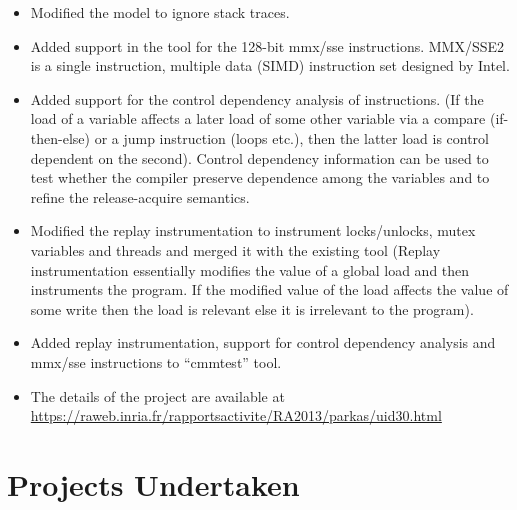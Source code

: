 \documentclass[margin,line]{resume}
\begin{document}
\begin{resume}
\begin{itemize}
\begin{itemize}
      \item Modified the model to ignore stack traces.
      \item Added support in the tool for the 128-bit mmx/sse instructions. MMX/SSE2 is a single instruction, multiple data (SIMD) instruction set designed by Intel.
      \item Added support for the control dependency analysis of instructions. (If the load of a variable affects a later load of some other variable via a compare (if-then-else) or a jump instruction (loops etc.), then the latter load is control dependent on the second). Control dependency information can be used to test whether the compiler preserve dependence among the variables and to refine the release-acquire semantics.
      \item Modified the replay instrumentation to instrument locks/unlocks, mutex variables and threads and merged it with the existing tool (Replay instrumentation essentially modifies the value of a global load and then instruments the program. If the modified value of the load affects the value of some write then the load is relevant else it is irrelevant to the program).
      \item Added replay instrumentation, support for control dependency analysis and mmx/sse instructions to ``cmmtest'' tool.
      \item The details of the project are available at \url{https://raweb.inria.fr/rapportsactivite/RA2013/parkas/uid30.html}
    \end{itemize}
  \end{itemize}
  \section{\mysidestyle Projects Undertaken}


\end{resume}
\end{document}

